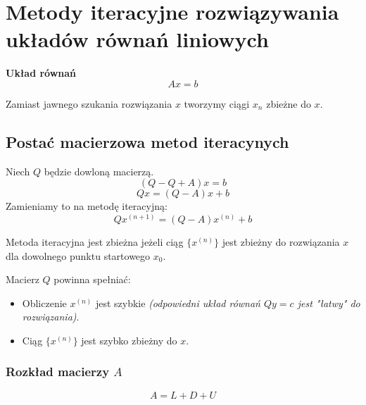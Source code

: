 \documentclass[../mn-notatki.tex]{subfiles}
\begin{document}
\section{Metody iteracyjne rozwiązywania układów równań liniowych}


\begin{tcolorbox}
\textbf{Układ równań}
\[
Ax = b
\]
\end{tcolorbox}

Zamiast jawnego szukania rozwiązania $x$ tworzymy ciągi $x_n$ zbieżne do $x.$

\subsection{Postać macierzowa metod iteracynych}

\begin{tcolorbox}
Niech $Q$ będzie dowloną macierzą.
\[
(Q - Q + A)x = b
\]
\[
Qx = (Q-A)x + b
\]
Zamieniamy to na metodę iteracyjną:
\[
Qx^{(n+1)} = (Q - A)x^{(n)} + b
\]
\end{tcolorbox}

\begin{tcolorbox}
Metoda iteracyjna jest zbieżna jeżeli ciąg $\{x^{(n)}\}$ jest zbieżny do
rozwiązania $x$ dla dowolnego punktu startowego $x_0$.
\end{tcolorbox}

Macierz $Q$ powinna spełniać:

\begin{itemize}
    \item Obliczenie $x^{(n)}$ jest szybkie \textit{(odpowiedni układ równań
    $Q y = c$ jest "łatwy" do rozwiązania)}.
    \item Ciąg  $\{x^{(n)}\}$  jest szybko zbieżny do $x$.
\end{itemize}

\pagebreak

\subsubsection{Rozkład macierzy $A$}
\begin{tcolorbox}
\[
A = L + D + U
\]
\end{tcolorbox}
\end{document}

